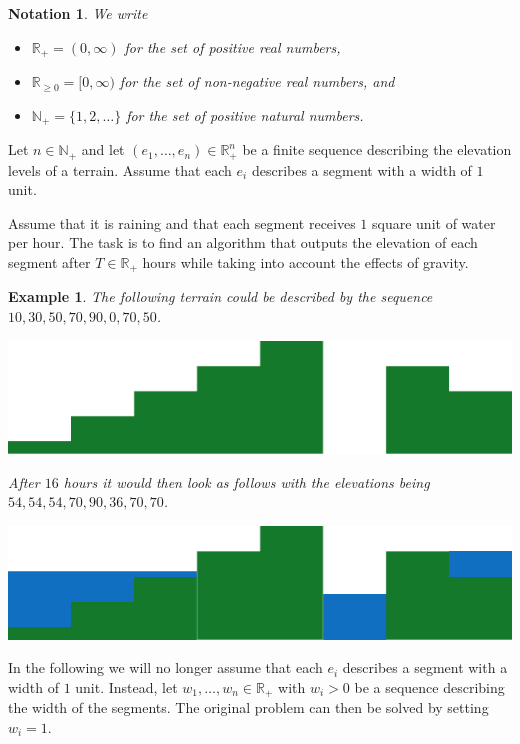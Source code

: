 \documentclass[11pt,a4paper]{article}
\newtheorem{ex}{Example}
\newtheorem{nota}{Notation}
\newcommand{\Np}{\mathbb{N}_+}
\newcommand{\Rp}{\mathbb{R}_+}
\newcommand{\Rnn}{\mathbb{R}_{\ge0}}
\begin{document}
\begin{nota}
  We write
  \begin{itemize}
    \item $\Rp = (0, \infty)$ for the set of positive real numbers,
    \item $\Rnn = [0, \infty)$ for the set of non-negative real numbers, and
    \item $\Np = \{ 1, 2, \ldots \}$ for the set of positive natural numbers.
  \end{itemize}
\end{nota}

Let $n\in\Np$ and let  $(e_1, \ldots, e_n) \in \Rp^n$ be a finite sequence describing the elevation levels of a terrain.
Assume that each $e_i$ describes a segment with a width of $1$ unit.

Assume that it is raining and that each segment receives $1$ square unit of water per hour.
The task is to find an algorithm that outputs the elevation of each segment after $T\in\Rp$ hours while taking into account the effects of gravity.

\begin{ex}
  The following terrain could be described by the sequence $10, 30, 50, 70, 90, 0, 70, 50$.
  \begin{center}
    \includegraphics{im1.pdf}
  \end{center}
  After $16$ hours it would then look as follows with the elevations being $54, 54, 54, 70, 90, 36, 70, 70$.
  \begin{center}
    \includegraphics{im2.pdf}
  \end{center}
\end{ex}

In the following we will no longer assume that each $e_i$ describes a segment with a width of $1$ unit.
Instead, let $w_1,\ldots,w_n \in \Rp$ with $w_i > 0$ be a sequence describing the width of the segments.
The original problem can then be solved by setting $w_i = 1$.
\end{document}
